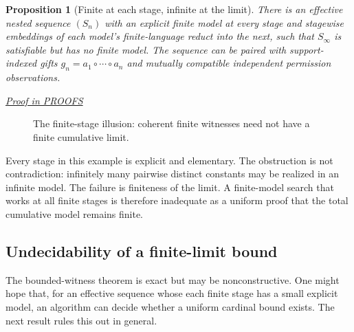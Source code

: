 \documentclass[11pt,letterpaper]{article}
\newtheorem{proposition}[theorem]{Proposition}
\theoremstyle{definition}\newtheorem{definition}[theorem]{Definition}\newtheorem{example}[theorem]{Example}
\theoremstyle{remark}\newtheorem{remark}[theorem]{Remark}
\newcommand{\prooflink}[1]{\par\noindent\hfill\small\hyperref[#1]{\textit{Proof in PROOFS}}\normalsize}
\begin{document}
\begin{proposition}[Finite at each stage, infinite at the limit]\label{w2:prop:escape}
There is an effective nested sequence $(S_n)$ with an explicit finite model at every stage and stagewise embeddings of each model's finite-language reduct into the next, such that $S_\infty$ is satisfiable but has \emph{no} finite model. The sequence can be paired with support-indexed gifts $g_n=a_1\circ\cdots\circ a_n$ and mutually compatible independent permission observations.
\prooflink{w2:pr:escape}
\end{proposition}

\begin{figure}[htbp]\centering
{}
\caption{The finite-stage illusion: coherent finite witnesses need not have a finite cumulative limit.}
\end{figure}

Every stage in this example is explicit and elementary. The obstruction is not contradiction: infinitely many pairwise distinct constants may be realized in an infinite model. The failure is finiteness of the limit. A finite-model search that works at all finite stages is therefore inadequate as a uniform proof that the total cumulative model remains finite.

\subsection{Undecidability of a finite-limit bound}
The bounded-witness theorem is exact but may be nonconstructive. One might hope that, for an effective sequence whose each finite stage has a small explicit model, an algorithm can decide whether a uniform cardinal bound exists. The next result rules this out in general.
\end{document}

